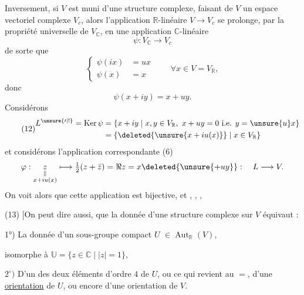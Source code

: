 Inversement, si $V$ est muni d'une structure complexe,  faisant de $V$ un espace vectoriel complexe $V_c$, alors l'application  $\mathbb R$-linéaire $V\longrightarrow V_c$ se prolonge, par la propriété universelle de $V_{\mathbb C}$, en une application $\mathbb C$-linéaire
\[
\tag{9}
\psi:V_{\mathbb C}\longrightarrow V_c
\]
de sorte que
\[
\tag{10}
\left\{\begin{aligned}
\psi(ix)&=ux\\
\psi(x)&=x
\end{aligned}\right.
\qquad\forall x\in V=V_{\mathbb R},
\]
donc
\[
\tag{11}
\psi(x+iy)=x+uy.
\]
  Considérons
\[
\tag{12}
\begin{aligned}
L^{\unsure{\prime|!}}=\operatorname{Ker}\psi
&=\{x+iy\mid x,y\in V_{\mathbb R},\ x+uy=0\ \text{i.e. }y=\unsure{u}x\}\\
&=\{\deleted{\unsure{x+iu(x)}}\mid x\in V_{\mathbb R}\}
\end{aligned}
\]
et considérons l'application correspondante (6)
\[
\begin{gathered}
\varphi:\underset{\substack{\Vert\\x+iu(x)}}z\longmapsto\tfrac12(z+\bar z)
=\Re z=x\deleted{\unsure{+uy}}:\quad L\longrightarrow V .
\end{gathered}
\]
On voit alors que cette application est bijective, et ,
,
,

(13) $[$On peut dire aussi, que la donnée d'une structure complexe sur $V$ équivaut :

1°) La donnée d'un  sous-groupe compact  $U$   $\in\operatorname{Aut}_{\mathbb R}(V)$, 

 isomorphe à $\mathbb U=\{z\in\mathbb C\mid |z|=1\}$, 

$2^\circ)$ D'un des deux éléments d'ordre $4$ de $U$, ou ce qui revient au $=$, d'une \uline{orientation} de $U$, ou encore  d'une orientation de $V$.

